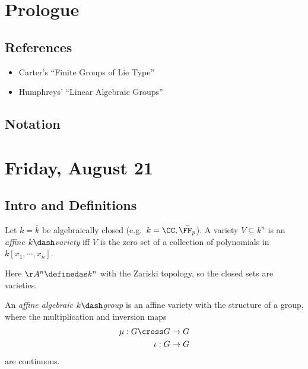 \newpage
\tableofcontents

\hypertarget{prologue}{%
\section*{Prologue}\label{prologue}}

\hypertarget{references}{%
\subsection{References}\label{references}}

\begin{itemize}
\item
  Carter's ``Finite Groups of Lie Type''\autocite{carter_1985}
\item
  Humphreys' ``Linear Algebraic Groups''\autocite{humphreys_2004}
\end{itemize}

\hypertarget{notation}{%
\subsection{Notation}\label{notation}}


\newpage

\hypertarget{friday-august-21}{%
\section{Friday, August 21}\label{friday-august-21}}

\hypertarget{intro-and-definitions}{%
\subsection{Intro and Definitions}\label{intro-and-definitions}}

\begin{definition}

Let \(k=\bar{k}\) be algebraically closed
(e.g.~\(k = \CC, \bar{\FF_p}\)). A variety \(V\subseteq k^n\) is an
\emph{affine \(k\dash\)variety} iff \(V\) is the zero set of a
collection of polynomials in \(k[x_1, \cdots, x_n]\).

\end{definition}

Here \(\AA^n\definedas k^n\) with the Zariski topology, so the closed
sets are varieties.

\begin{definition}

An \emph{affine algebraic \(k\dash\)group} is an affine variety with the
structure of a group, where the multiplication and inversion maps
\begin{align*}  
\mu: G\cross G &\to G \\
\iota: G&\to G
\end{align*} are continuous.

\end{definition}

